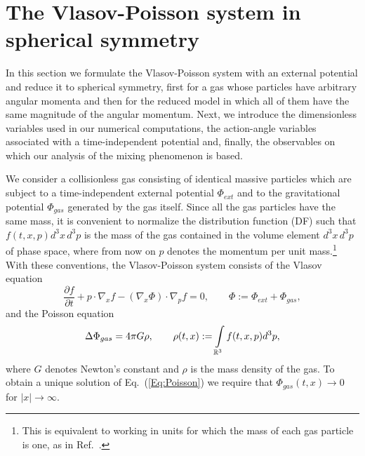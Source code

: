 \section{The Vlasov-Poisson system in spherical symmetry}
\label{Sec:VPSphSym}

In this section we formulate the Vlasov-Poisson system with an external potential and reduce it to spherical symmetry, first for a gas whose particles have arbitrary angular momenta and then for the reduced model in which all of them have the same magnitude of the angular momentum. Next, we introduce the dimensionless variables used in our numerical computations, the action-angle variables associated with a time-independent potential and, finally, the observables on which our analysis of the mixing phenomenon is based.

We consider a collisionless gas consisting of identical massive particles which are subject to a time-independent external potential $\Phi_{ext}$ and to the gravitational potential $\Phi_{gas}$ generated by the gas itself. Since all the gas particles have the same mass, it is convenient to normalize the distribution function (DF) such that $f(t,x,p) d^3 x\, d^3 p$ is the mass of the gas contained in the volume element $d^3 x\, d^3 p$ of phase space, where from now on $p$ denotes the momentum per unit mass.\footnote{This is equivalent to working in units for which the mass of each gas particle is one, as in Ref.~\cite{pRoS20}.} With these conventions, the Vlasov-Poisson system consists of the Vlasov equation
\begin{equation}
\frac{\partial f}{\partial t} + p\cdot\nabla_x f - (\nabla_x\Phi)\cdot\nabla_p f = 0,\qquad
\Phi := \Phi_{ext} + \Phi_{gas},
\label{Eq:Vlasov}
\end{equation}
and the Poisson equation
\begin{equation}
\Delta\Phi_{gas} = 4\pi G\rho,\qquad
\rho(t,x) := \int\limits_{\mathbb{R}^3} f(t,x,p) d^3 p,
\label{Eq:Poisson}
\end{equation}
where $G$ denotes Newton's constant and $\rho$ is the mass density of the gas. To obtain a unique solution of Eq.~(\ref{Eq:Poisson}) we require that $\Phi_{gas}(t,x)\to 0$ for $|x|\to \infty$.

